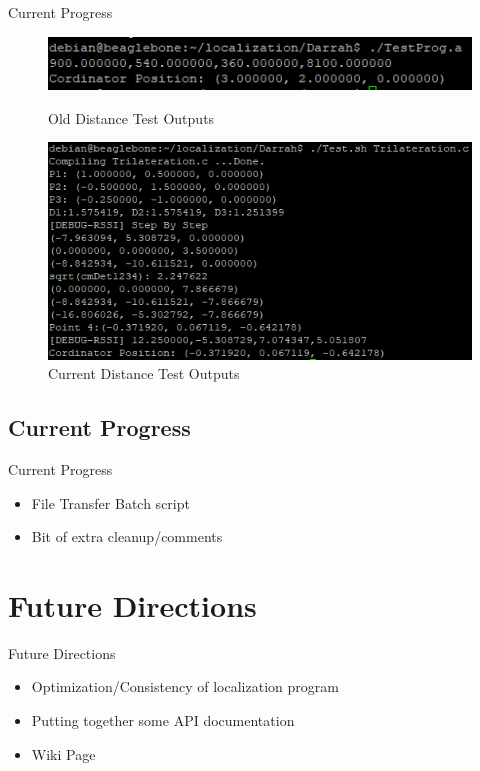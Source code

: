 \documentclass{beamer}
\begin{document}
\begin{frame}{Current Progress}    
	\begin{figure}
    \centering
    \includegraphics[scale=0.7]{figs/ScreenShots/LocalizationTestOutput.PNG}
    \caption{Old Distance Test Outputs}
    \label{fig:RSSIOutputTable_Paper}
	
    \centering
    \includegraphics[scale=0.7]{figs/ScreenShots/PositionOutput.PNG}
    \caption{Current Distance Test Outputs}
    \label{fig:RSSIOutputTable_Paper}
    \end{figure}
\end{frame}

\subsection{Current Progress}
\begin{frame}{Current Progress}
	\begin{itemize}
    \item File Transfer Batch script
    \item Bit of extra cleanup/comments
    \end{itemize}
\end{frame}


\section{Future Directions}

\begin{frame}{Future Directions}{}
    \begin{itemize}
        \item Optimization/Consistency of localization program
        \item Putting together some API documentation
        \item Wiki Page
    \end{itemize}
\end{frame}
\end{document}
